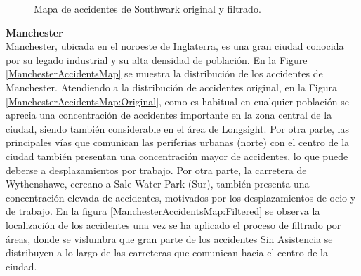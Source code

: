 \documentclass{uathesis-es}
\begin{document}
{\begin{figure}[H]
{				\label{SouthwarkAccidentsMap:Filtered}
			}
			\caption{Mapa de accidentes de Southwark original y filtrado.}
			\label{SouthwarkAccidentsMap}
		\end{figure}
		
		
		\textbf{Manchester}\\
		
		Manchester, ubicada en el noroeste de Inglaterra, es una gran ciudad conocida por su legado industrial y su alta densidad de población. En la Figure \ref{ManchesterAccidentsMap} se muestra la distribución de los accidentes de Manchester. Atendiendo a la distribución de accidentes original, en la Figura \ref{ManchesterAccidentsMap:Original}, como es habitual en cualquier población se aprecia una concentración de accidentes importante en la zona central de la ciudad, siendo también considerable en el área de Longsight. Por otra parte, las principales vías que comunican las periferias urbanas (norte) con el centro de la ciudad también presentan una concentración mayor de accidentes, lo que puede deberse a desplazamientos por trabajo. Por otra parte, la carretera de Wythenshawe, cercano a Sale Water Park (Sur), también presenta una concentración elevada de accidentes, motivados por los desplazamientos de ocio y de trabajo. En la figura \ref{ManchesterAccidentsMap:Filtered} se observa la localización de los accidentes una vez se ha aplicado el proceso de filtrado por áreas, donde se vislumbra que gran parte de los accidentes Sin Asistencia se distribuyen a lo largo de las carreteras que comunican hacia el centro de la ciudad.
		
		
}
\end{document}
